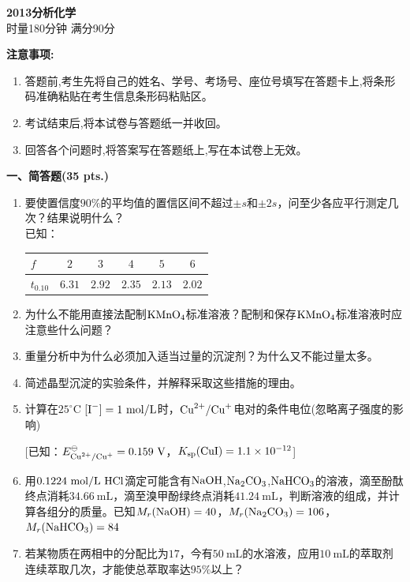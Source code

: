 \begin{center}
    {\LARGE \textbf{2013分析化学}} \\[2ex]
    {\large 时量180分钟 \quad 满分90分}
\end{center}

\vspace{0.5cm}
\noindent\textbf{注意事项:}
\begin{enumerate}[label=\arabic*., parsep=0pt, itemsep=0pt]
    \item 答题前,考生先将自己的姓名、学号、考场号、座位号填写在答题卡上,将条形码准确粘贴在考生信息条形码粘贴区。
    \item 考试结束后,将本试卷与答题纸一并收回。
    \item 回答各个问题时,将答案写在答题纸上,写在本试卷上无效。
\end{enumerate}

\vspace{0.5cm}
\noindent\textbf{一、简答题(35 pts.)}

\begin{enumerate}[label=\arabic*., itemsep=1.5ex]
    \item 要使置信度$90\%$的平均值的置信区间不超过$\pm s$和$\pm 2s$，问至少各应平行测定几次？结果说明什么？
    \\
    已知：
    \begin{center}
    \begin{tabular}{l|ccccc}
    $f$ & $2$ & $3$ & $4$ & $5$ & $6$ \\
    \hline
    $t_{0.10}$ & $6.31$ & $2.92$ & $2.35$ & $2.13$ & $2.02$ \\
    \end{tabular}
    \end{center}
    \item 为什么不能用直接法配制$\ce{KMnO4}$标准溶液？配制和保存$\ce{KMnO4}$标准溶液时应注意些什么问题？
    \item 重量分析中为什么必须加入适当过量的沉淀剂？为什么又不能过量太多。
    \item 简述晶型沉淀的实验条件，并解释采取这些措施的理由。
    \item 计算在$25^\circ\mathrm{C}$ $[\ce{I^-}]=1\ \mathrm{mol/L}$时，$\ce{Cu^{2+}/Cu^+}$电对的条件电位(忽略离子强度的影响)
    
    [已知：$E^\ominus_{\ce{Cu^{2+}/Cu^+}}=0.159\ \mathrm{V}$，$K_{\mathrm{sp}}(\ce{CuI})=1.1\times10^{-12}$]
    \item 用$0.1224\ \mathrm{mol/L}\ \ce{HCl}$滴定可能含有$\ce{NaOH}$,$\ce{Na2CO3}$,$\ce{NaHCO3}$的溶液，滴至酚酞终点消耗$34.66\ \mathrm{mL}$，滴至溴甲酚绿终点消耗$41.24\ \mathrm{mL}$，判断溶液的组成，并计算各组分的质量。已知$M_r(\ce{NaOH})=40$，$M_r(\ce{Na2CO3})=106$，$M_r(\ce{NaHCO3})=84$
    \item 若某物质在两相中的分配比为$17$，今有$50\ \mathrm{mL}$的水溶液，应用$10\ \mathrm{mL}$的萃取剂连续萃取几次，才能使总萃取率达$95\%$以上？
\end{enumerate}

